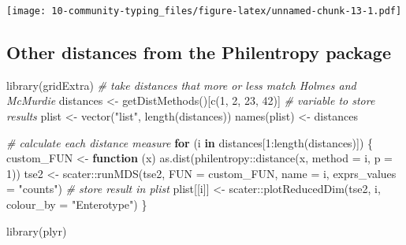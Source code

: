\documentclass[
  oneside]{book}
\newenvironment{Shaded}{\begin{snugshade}}{\end{snugshade}}
\newcommand{\AttributeTok}[1]{\textcolor[rgb]{0.77,0.63,0.00}{#1}}
\newcommand{\CommentTok}[1]{\textcolor[rgb]{0.56,0.35,0.01}{\textit{#1}}}
\newcommand{\ControlFlowTok}[1]{\textcolor[rgb]{0.13,0.29,0.53}{\textbf{#1}}}
\newcommand{\DecValTok}[1]{\textcolor[rgb]{0.00,0.00,0.81}{#1}}
\newcommand{\FunctionTok}[1]{\textcolor[rgb]{0.00,0.00,0.00}{#1}}
\newcommand{\NormalTok}[1]{#1}
\newcommand{\OtherTok}[1]{\textcolor[rgb]{0.56,0.35,0.01}{#1}}
\newcommand{\SpecialCharTok}[1]{\textcolor[rgb]{0.00,0.00,0.00}{#1}}
\newcommand{\StringTok}[1]{\textcolor[rgb]{0.31,0.60,0.02}{#1}}
\begin{document}
\texttt{[image: 10-community-typing\_files/figure-latex/unnamed-chunk-13-1.pdf]}

\hypertarget{other-distances-from-the-philentropy-package}{%
\subsection{Other distances from the Philentropy package}\label{other-distances-from-the-philentropy-package}}

\begin{Shaded}
\begin{Highlighting}[]
\FunctionTok{library}\NormalTok{(gridExtra)}
\CommentTok{\# take distances that more or less match Holmes and McMurdie}
\NormalTok{distances }\OtherTok{\textless{}{-}} \FunctionTok{getDistMethods}\NormalTok{()[}\FunctionTok{c}\NormalTok{(}\DecValTok{1}\NormalTok{, }\DecValTok{2}\NormalTok{, }\DecValTok{23}\NormalTok{, }\DecValTok{42}\NormalTok{)]}
\CommentTok{\# variable to store results}
\NormalTok{plist }\OtherTok{\textless{}{-}} \FunctionTok{vector}\NormalTok{(}\StringTok{"list"}\NormalTok{, }\FunctionTok{length}\NormalTok{(distances))}
\FunctionTok{names}\NormalTok{(plist) }\OtherTok{\textless{}{-}}\NormalTok{ distances}

\CommentTok{\# calculate each distance measure}
\ControlFlowTok{for}\NormalTok{ (i }\ControlFlowTok{in}\NormalTok{ distances[}\DecValTok{1}\SpecialCharTok{:}\FunctionTok{length}\NormalTok{(distances)]) \{}
\NormalTok{  custom\_FUN }\OtherTok{\textless{}{-}} \ControlFlowTok{function}\NormalTok{ (x) }\FunctionTok{as.dist}\NormalTok{(philentropy}\SpecialCharTok{::}\FunctionTok{distance}\NormalTok{(x, }\AttributeTok{method =}\NormalTok{ i, }\AttributeTok{p =} \DecValTok{1}\NormalTok{))}
\NormalTok{  tse2 }\OtherTok{\textless{}{-}}\NormalTok{ scater}\SpecialCharTok{::}\FunctionTok{runMDS}\NormalTok{(tse2, }\AttributeTok{FUN =}\NormalTok{ custom\_FUN, }\AttributeTok{name =}\NormalTok{ i, }\AttributeTok{exprs\_values =} \StringTok{"counts"}\NormalTok{)}
  \CommentTok{\# store result in plist}
\NormalTok{  plist[[i]] }\OtherTok{\textless{}{-}}\NormalTok{ scater}\SpecialCharTok{::}\FunctionTok{plotReducedDim}\NormalTok{(tse2, i, }\AttributeTok{colour\_by =} \StringTok{"Enterotype"}\NormalTok{)}
\NormalTok{\}}

\FunctionTok{library}\NormalTok{(plyr)}


\end{Highlighting}
\end{Shaded}
\end{document}
